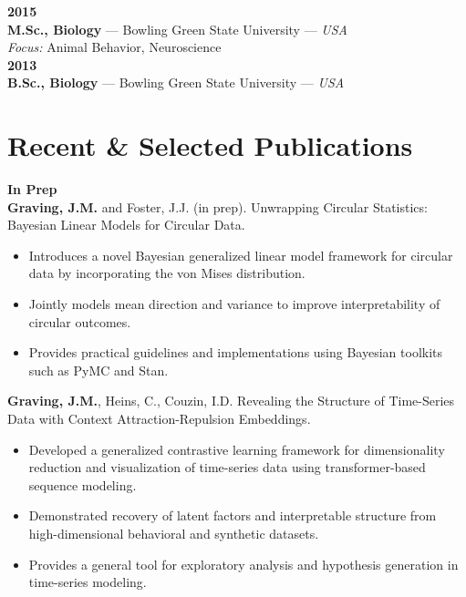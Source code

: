 \documentclass[10pt,letterpaper]{article}
\begin{document}
\textbf{2015} \\
\textbf{M.Sc., Biology} — Bowling Green State University — \textit{USA} \\
\textit{Focus:} Animal Behavior, Neuroscience \\

\textbf{2013} \\
\textbf{B.Sc., Biology} — Bowling Green State University — \textit{USA}





	
	\section*{Recent \& Selected Publications}
	\textbf{In Prep}\\
	\textbf{Graving, J.M.} and Foster, J.J. (in prep). Unwrapping Circular Statistics: Bayesian Linear Models for Circular Data.
	\begin{itemize}
		\item Introduces a novel Bayesian generalized linear model framework for circular data by incorporating the von Mises distribution.
		\item Jointly models mean direction and variance to improve interpretability of circular outcomes.
		\item Provides practical guidelines and implementations using Bayesian toolkits such as PyMC and Stan.
	\end{itemize}
	
	\textbf{Graving, J.M.}, Heins, C., Couzin, I.D. Revealing the Structure of Time-Series Data with Context Attraction-Repulsion Embeddings.
	\begin{itemize}
		\item Developed a generalized contrastive learning framework for dimensionality reduction and visualization of time-series data using transformer-based sequence modeling.
		\item Demonstrated recovery of latent factors and interpretable structure from high-dimensional behavioral and synthetic datasets.
		\item Provides a general tool for exploratory analysis and hypothesis generation in time-series modeling.
	\end{itemize}
	
\end{document}
